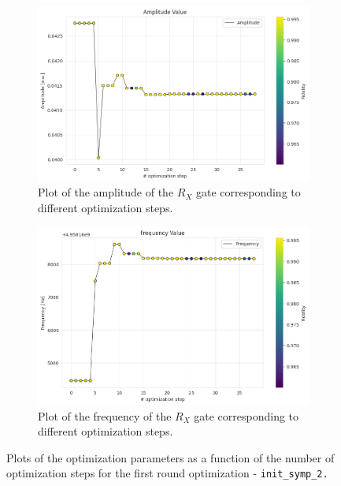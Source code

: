 \begin{figure}[h!]
    \centering
    \begin{subfigure}[t]{0.45\textwidth}
        \includegraphics[width=\textwidth]{figures/png/RB_optimization/NM/InitialSymplex/20241113_181711/Amplitude.png}
        \caption{Plot of the amplitude of the $R_X$ gate corresponding to different optimization steps.}
        \label{fig:20241113_181711:amplitude}
    \end{subfigure}
    \hfill
    \begin{subfigure}[t]{0.45\textwidth}
        \includegraphics[width=\textwidth]{figures/png/RB_optimization/NM/InitialSymplex/20241113_181711/Frequency.png}
        \caption{Plot of the frequency of the $R_X$ gate corresponding to different optimization steps.}
        \label{fig:20241113_181711:frequency}
    \end{subfigure}
    \caption{Plots of the optimization parameters as a function of the number of optimization steps for the first round optimization - \tt{init\_symp\_2}.}
    \label{fig:20241113_181711:parameters}
\end{figure}


